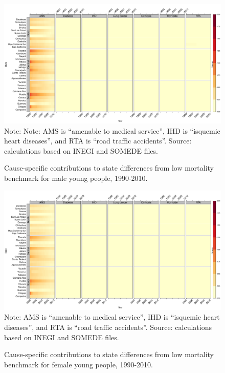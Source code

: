\documentclass[11.5pt]{article}
\begin{document}
{\begin{figure}
\centering
\caption{Cause-specific contributions to state differences from low mortality benchmark for male young people, 1990-2010.}
\label{fig:e0_14_males}
\includegraphics[scale=.3]{Figures/Young_Male_heatmap.pdf}
Note: Note: AMS is ``amenable to medical service'', IHD is ``isquemic heart diseases'', and RTA is ``road traffic accidents''. Source: calculations based on INEGI and SOMEDE files. \end{figure}

\begin{figure}
\centering
\caption{Cause-specific contributions to state differences from low mortality benchmark for female young people, 1990-2010.}
\label{fig:e0_14_females}
\includegraphics[scale=.3]{Figures/Young_Female_heatmap.pdf}
Note: AMS is ``amenable to medical service'', IHD is ``isquemic heart diseases'', and RTA is ``road traffic accidents''. Source: calculations based on INEGI and SOMEDE files. \end{figure}



}
\end{document}
